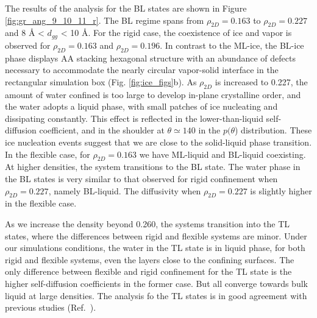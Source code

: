 \documentclass[journal=acsnano,manuscript=article]{achemso}
\begin{document}
The results of the analysis for the BL states are shown in Figure \ref{fig:gr_ang_9_10_11_r}. The BL regime spans from \(\rho_{2D}=0.163\) to \(\rho_{2D}=0.227\) and 8 \r A < \(d_{gg}\) < 10 \r A. For the rigid case, the coexistence of ice and vapor is observed for \(\rho_{2D}=0.163\) and \(\rho_{2D}=0.196\). In contrast to the ML-ice, the BL-ice phase displays AA stacking hexagonal structure with an abundance of defects necessary to accommodate the nearly circular vapor-solid interface in the rectangular simulation box (Fig. \ref{fig:ice_figs}b). As \(\rho_{2D}\) is increased to 0.227, the amount of water confined is too large to develop in-plane crystalline order, and the water adopts a liquid phase, with small patches of ice nucleating and dissipating constantly. This effect is reflected in the lower-than-liquid self-diffusion coefficient, and in the shoulder at \(\theta\simeq140\) in the \(p(\theta\)) distribution. These ice nucleation events suggest that we are close to the solid-liquid phase transition. In the flexible case, for \(\rho_{2D}=0.163\) we have ML-liquid and BL-liquid coexisting. At higher densities, the system transitions to the BL state. The water phase in the BL states is very similar to that observed for rigid confinement when \(\rho_{2D}=0.227\), namely BL-liquid. The diffusivity when \(\rho_{2D}=0.227\) is slightly higher in the flexible case.

As we increase the density beyond 0.260, the systems transition into the TL states, where the differences between rigid and flexible systems are minor. Under our simulations conditions, the water in the TL state is in liquid phase, for both rigid and flexible systems, even the layers close to the confining surfaces. The only difference between flexible and rigid confinement for the TL state is the higher self-diffusion coefficients in the former case. But all converge towards bulk liquid at large densities. The analysis fo the TL states is in good agreement with previous studies (Ref.~).

\setlength{\fboxsep}{0.75pt}%
\setlength{\fboxrule}{1.2pt}%
\end{document}
